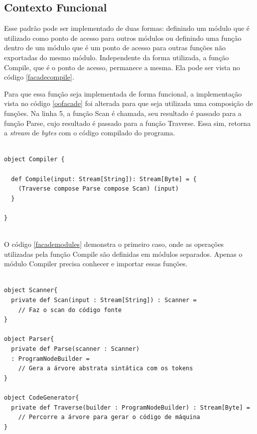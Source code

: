 \subsection*{Contexto Funcional}

Esse padrão pode ser implementado de duas formas: 
definindo um módulo que é utilizado como ponto de 
acesso para outros módulos ou definindo uma 
função dentro de um módulo que é um ponto de 
acesso para outras funções não exportadas do 
mesmo módulo. Independente da forma utilizada, 
a função Compile, que é o ponto de acesso, permanece 
a mesma. Ela pode ser vista no código \ref{facadecompile}. 

Para que essa função seja implementada de forma 
funcional, a implementação vista no código \ref{oofacade} 
foi alterada para que seja utilizada uma composição 
de funções. Na linha 5, a função Scan é chamada, 
seu resultado é passado para a função Parse, cujo 
resultado é passado para a função Traverse. Essa sim, 
retorna a \textit{stream} de \textit{bytes} com o 
código compilado do programa.

\begin{lstlisting}[caption={Função de acesso Compile},label=facadecompile]
    
object Compiler {

  def Compile(input: Stream[String]): Stream[Byte] = {
    (Traverse compose Parse compose Scan) (input)
  }
  
}
    
\end{lstlisting}

O código \ref{facademodules} demonstra o primeiro caso, 
onde as operações utilizadas pela função Compile são 
definidas em módulos separados. Apenas o módulo 
Compiler precisa conhecer e importar essas funções.

\begin{lstlisting}[caption={Função de acesso Compile},label=facademodules]
    
object Scanner{
  private def Scan(input : Stream[String]) : Scanner = 
    // Faz o scan do código fonte
}

object Parser{
  private def Parse(scanner : Scanner)
  : ProgramNodeBuilder = 
    // Gera a árvore abstrata sintática com os tokens
}

object CodeGenerator{
  private def Traverse(builder : ProgramNodeBuilder) : Stream[Byte] = 
    // Percorre a árvore para gerar o código de máquina
}

\end{lstlisting}

